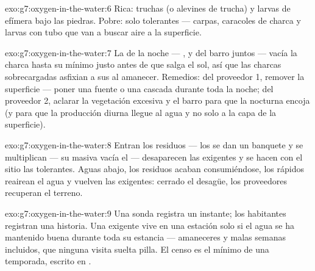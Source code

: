 \begin{solution}{exo:g7:oxygen-in-the-water:6}
Rica: truchas (o alevines de trucha) y larvas de efímera bajo las
piedras. Pobre: solo  tolerantes --- carpas, caracoles de
charca y larvas con tubo que van a buscar aire a la superficie.
\end{solution}

\begin{solution}{exo:g7:oxygen-in-the-water:7}
La  de la noche --- ,  y  del
barro juntos --- vacía la charca hasta su mínimo justo antes de que
salga el sol, así que las charcas sobrecargadas asfixian a sus  al
amanecer. Remedios: del proveedor 1, remover la superficie --- poner
una fuente o una cascada durante toda la noche; del proveedor 2,
aclarar la vegetación excesiva y el barro para que la 
nocturna encoja (y para que la producción diurna llegue al agua y no
solo a la capa de la superficie).
\end{solution}

\begin{solution}{exo:g7:oxygen-in-the-water:8}
Entran los residuos --- los  se dan un banquete y se
multiplican --- su  masiva vacía el  --- desaparecen
las  exigentes y se hacen con el sitio las tolerantes. Aguas
abajo, los residuos acaban consumiéndose, los rápidos reairean el agua
y vuelven las  exigentes: cerrado el desagüe, los proveedores
recuperan el terreno.
\end{solution}

\begin{solution}{exo:g7:oxygen-in-the-water:9}
Una sonda registra un instante; los habitantes registran una historia.
Una  exigente vive en una estación solo si el agua se ha
mantenido buena durante toda su estancia --- amaneceres y malas semanas
incluidos, que ninguna visita suelta pilla. El censo es el mínimo de una
temporada, escrito en .
\end{solution}

